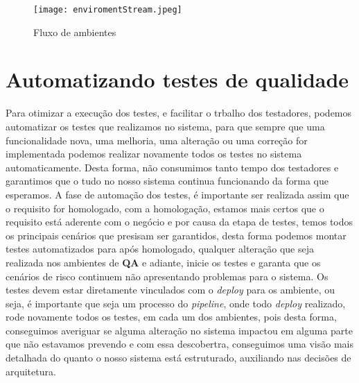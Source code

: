       \begin{figure}[!h]
        \centering
        \texttt{[image: enviromentStream.jpeg]}
        \caption{Fluxo de ambientes}
        \label{Imagem:2}
      \end{figure}

    \section{Automatizando testes de qualidade}
      Para otimizar a execução dos testes, e facilitar o trbalho dos testadores,
      podemos automatizar os testes que realizamos no sistema, para que sempre que
      uma funcionalidade nova, uma melhoria, uma alteração ou uma correção for
      implementada podemos realizar novamente todos os testes no sistema
      automaticamente. Desta forma, não consumimos tanto tempo dos testadores e
      garantimos que o tudo no nosso sistema continua funcionando da forma que
      esperamos. A fase de automação dos testes, é importante ser realizada assim
      que o requisito for homologado, com a homologação, estamos mais certos que o
      requisito está aderente com o negócio e por causa da etapa de testes, temos
      todos os principais cenários que presisam ser garantidos, desta forma podemos
      montar testes automatizados para após homologado, qualquer alteração que seja
      realizada nos ambientes de \textbf{QA} e adiante, inicie os testes e garanta
      que os cenários de risco continuem não apresentando problemas para o sistema. \newline
      Os testes devem estar diretamente vinculados com o \textit{deploy} para os
      ambiente, ou seja, é importante que seja um processo do \textit{pipeline},
      onde todo \textit{deploy} realizado, rode novamente todos os testes, em cada
      um dos ambientes, pois desta forma, conseguimos averiguar se alguma alteração
      no sistema impactou em alguma parte que não estavamos prevendo e com essa
      descobertra, conseguimos uma visão mais detalhada do quanto o nosso sistema
      está estruturado, auxiliando nas decisões de arquitetura.

